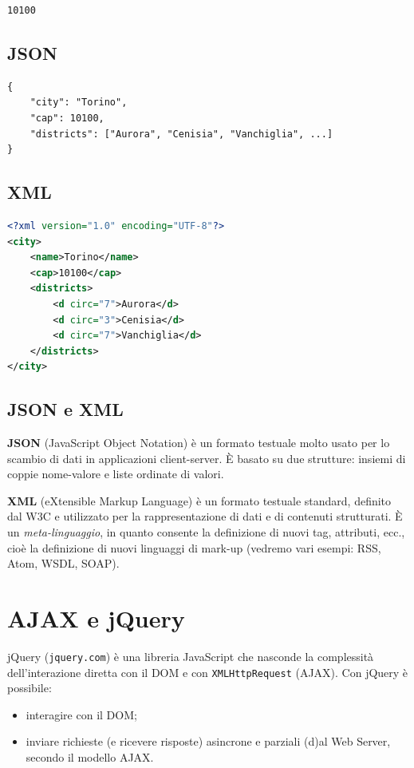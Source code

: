 \begin{lstlisting}
10100
\end{lstlisting}

\subsection{JSON}

\begin{lstlisting}
{
    "city": "Torino",
    "cap": 10100,
    "districts": ["Aurora", "Cenisia", "Vanchiglia", ...]
}
\end{lstlisting}

\subsection{XML}

\begin{lstlisting}[language=XML]
<?xml version="1.0" encoding="UTF-8"?>
<city>
    <name>Torino</name>
    <cap>10100</cap>
    <districts>
        <d circ="7">Aurora</d>
        <d circ="3">Cenisia</d>
        <d circ="7">Vanchiglia</d>
    </districts>
</city>
\end{lstlisting}

\subsection{JSON e XML}

\textbf{JSON} (JavaScript Object Notation) è un formato testuale molto usato per lo scambio di dati in applicazioni client-server. È basato su due strutture: insiemi di coppie nome-valore e liste ordinate di valori.

\textbf{XML} (eXtensible Markup Language) è un formato testuale standard, definito dal W3C e utilizzato per la rappresentazione di dati e di contenuti strutturati. È un \textit{meta-linguaggio}, in quanto consente la definizione di nuovi tag, attributi, ecc., cioè la definizione di nuovi linguaggi di mark-up (vedremo vari esempi: RSS, Atom, WSDL, SOAP).

\section{AJAX e jQuery}

jQuery (\texttt{jquery.com}) è una libreria JavaScript che nasconde la complessità dell'interazione diretta con il DOM e con \texttt{XMLHttpRequest} (AJAX). Con jQuery è possibile:
\begin{itemize}
    \item interagire con il DOM;
    \item inviare richieste (e ricevere risposte) asincrone e parziali (d)al Web Server, secondo il modello AJAX.
\end{itemize}

